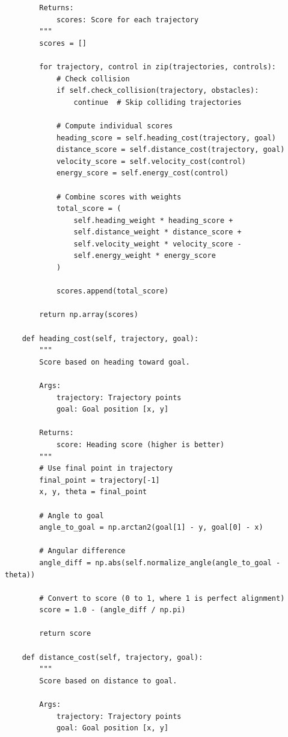 \begin{lstlisting}
        Returns:
            scores: Score for each trajectory
        """
        scores = []
        
        for trajectory, control in zip(trajectories, controls):
            # Check collision
            if self.check_collision(trajectory, obstacles):
                continue  # Skip colliding trajectories
            
            # Compute individual scores
            heading_score = self.heading_cost(trajectory, goal)
            distance_score = self.distance_cost(trajectory, goal)
            velocity_score = self.velocity_cost(control)
            energy_score = self.energy_cost(control)
            
            # Combine scores with weights
            total_score = (
                self.heading_weight * heading_score +
                self.distance_weight * distance_score +
                self.velocity_weight * velocity_score -
                self.energy_weight * energy_score
            )
            
            scores.append(total_score)
        
        return np.array(scores)
    
    def heading_cost(self, trajectory, goal):
        """
        Score based on heading toward goal.
        
        Args:
            trajectory: Trajectory points
            goal: Goal position [x, y]
            
        Returns:
            score: Heading score (higher is better)
        """
        # Use final point in trajectory
        final_point = trajectory[-1]
        x, y, theta = final_point
        
        # Angle to goal
        angle_to_goal = np.arctan2(goal[1] - y, goal[0] - x)
        
        # Angular difference
        angle_diff = np.abs(self.normalize_angle(angle_to_goal - theta))
        
        # Convert to score (0 to 1, where 1 is perfect alignment)
        score = 1.0 - (angle_diff / np.pi)
        
        return score
    
    def distance_cost(self, trajectory, goal):
        """
        Score based on distance to goal.
        
        Args:
            trajectory: Trajectory points
            goal: Goal position [x, y]
            

\end{lstlisting}

